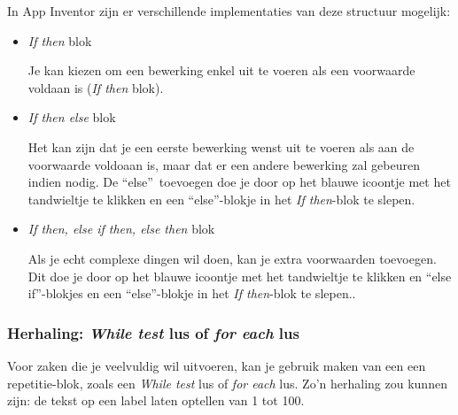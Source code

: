 In App Inventor zijn er verschillende implementaties van deze structuur mogelijk:
\begin{itemize}
	\item \emph{If then} blok \\
	\begin{minipage}{.5\linewidth}
	Je kan kiezen om een bewerking enkel uit te voeren als een voorwaarde voldaan is (\emph{If then} blok).
	\end{minipage}
	\begin{minipage}{.5\linewidth}
	\end{minipage}	
	\item \emph{If then else} blok \\
	\begin{minipage}{.5\linewidth}
			Het kan zijn dat je een eerste bewerking wenst uit te voeren als aan de voorwaarde voldoaan is, maar dat er een andere bewerking zal gebeuren indien nodig. De \textquotedblleft else\textquotedblright \ toevoegen doe je door op het blauwe icoontje met het tandwieltje te klikken en een \textquotedblleft else\textquotedblright -blokje in het \emph{If then}-blok te slepen.
	\end{minipage}
	\begin{minipage}{.5\linewidth}
	\end{minipage}	
	\item \emph{If then, else if then, else then} blok \\
	\begin{minipage}{.5\linewidth}
		Als je echt complexe dingen wil doen, kan je extra voorwaarden toevoegen. Dit doe je door op het blauwe icoontje met het tandwieltje te klikken en \textquotedblleft else if\textquotedblright -blokjes en een \textquotedblleft else\textquotedblright -blokje in het \emph{If then}-blok te slepen..
	\end{minipage}
	\begin{minipage}{.5\linewidth}
	\end{minipage}	
\end{itemize}

\subsubsection{Herhaling: \emph{While test} lus of \emph{for each} lus}

Voor zaken die je veelvuldig wil uitvoeren, kan je gebruik maken van een een repetitie-blok, zoals een \emph{While test} lus of \emph{for each} lus. 
Zo'n herhaling zou kunnen zijn: de tekst op een label laten optellen van 1 tot 100.

